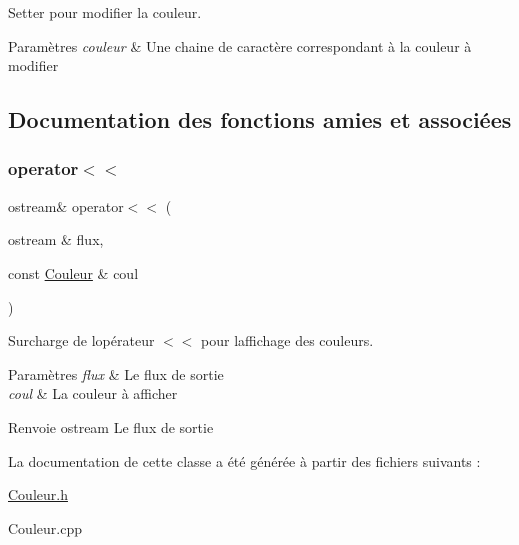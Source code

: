 Setter pour modifier la couleur. 


\begin{DoxyParams}{Paramètres}
{\em couleur} & Une chaine de caractère correspondant à la couleur à modifier \\
\hline
\end{DoxyParams}


\subsection{Documentation des fonctions amies et associées}
\mbox{\label{class_couleur_a8223b4eee2017fdd318d16692a16c636}} 
\subsubsection{\texorpdfstring{operator$<$$<$}{operator<<}}
{\footnotesize\ttfamily ostream\& operator$<$$<$ (\begin{DoxyParamCaption}\item[{ostream \&}]{flux,  }\item[{const \mbox{\hyperlink{class_couleur}{Couleur}} \&}]{coul }\end{DoxyParamCaption})\hspace{0.3cm}{\ttfamily [friend]}}



Surcharge de l\textquotesingle{}opérateur $<$$<$ pour l\textquotesingle{}affichage des couleurs. 


\begin{DoxyParams}{Paramètres}
{\em flux} & Le flux de sortie \\
\hline
{\em coul} & La couleur à afficher \\
\hline
\end{DoxyParams}
\begin{DoxyReturn}{Renvoie}
ostream Le flux de sortie 
\end{DoxyReturn}


La documentation de cette classe a été générée à partir des fichiers suivants \+:\begin{DoxyCompactItemize}
\item 
\mbox{\hyperlink{_couleur_8h}{Couleur.\+h}}\item 
Couleur.\+cpp\end{DoxyCompactItemize}
